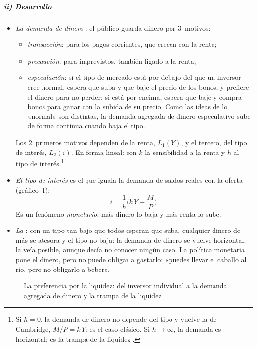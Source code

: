 \documentclass[11pt]{article}
\begin{document}
\subparagraph{ii) Desarrollo}

\begin{itemize}
\item \emph{La demanda de dinero} : el público guarda dinero por 3~motivos\nocite{Keynes1936}:
  \begin{itemize}
  \item \emph{transacción}: para los pagos corrientes, que crecen con la renta;
  \item \emph{precaución}: para imprevistos, también ligado a la renta;
  \item \emph{especulación}: si el tipo de mercado está por debajo del que un inversor cree normal, espera que suba y que baje el precio de los bonos, y prefiere el dinero para no perder; si está por encima, espera que baje y compra bonos para ganar con la subida de su precio. Como las ideas de lo «normal» son distintas, la demanda agregada de dinero especulativo sube de forma continua cuando baja el tipo.
  \end{itemize}
  Los 2~primeros motivos dependen de la renta, $L_1(Y)$, y el tercero, del tipo de interés, $L_2(i)$. En forma lineal:
  con $k$ la sensibilidad a la renta y $h$ al tipo de interés.\footnote{Si $h=0$, la demanda de dinero no depende del tipo y vuelve la de Cambridge, $M/P=k\,Y$: es el caso clásico. Si $h\to\infty$, la demanda es horizontal: es la trampa de la liquidez .}
\item \emph{El tipo de interés} es el que iguala la demanda de saldos reales con la oferta (gráfico~\ref{fig:liquidez}):
  \begin{equation}
  i=\frac{1}{h}\Big(k\,Y-\frac{M}{P}\Big). \label{eq:tipo-keynes}
  \end{equation}
  Es un fenómeno \emph{monetario}: más dinero lo baja y más renta lo sube.
\item \emph{La }: con un tipo tan bajo que todos esperan que suba, cualquier dinero de más se atesora y el tipo no baja: la demanda de dinero se vuelve horizontal\nocite{Keynes1936}.  la veía posible, aunque decía no conocer ningún caso. La política monetaria pone el dinero, pero no puede obligar a gastarlo: «puedes llevar el caballo al río, pero no obligarlo a beber».
\end{itemize}

\begin{figure}[H]
\centering
\caption{La preferencia por la liquidez: del inversor individual a la demanda agregada de dinero y la trampa de la liquidez}\label{fig:liquidez}
\end{figure}
\end{document}
